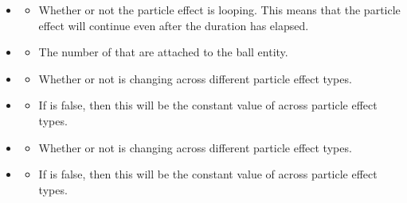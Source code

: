 \begin{singlespace}

	\begin{itemize}[nolistsep,topsep=5pt]
	\itemsep1.0em

		\item {}
		\begin{itemize}[nolistsep,topsep=0pt]
			\item Whether or not the particle effect is looping. This means that the particle effect will continue even after the duration has elapsed.
		\end{itemize}

		\item {}
		\begin{itemize}[nolistsep,topsep=0pt]
			\item The number of  that are attached to the ball entity.
		\end{itemize}

		\item {}
		\begin{itemize}[nolistsep,topsep=0pt]
			\item Whether or not  is changing across different particle effect types.
		\end{itemize}

		\item {}
		\begin{itemize}[nolistsep,topsep=0pt]
			\item If  is false, then this will be the constant value of  across particle effect types.
		\end{itemize}

		\item {}
		\begin{itemize}[nolistsep,topsep=0pt]
			\item Whether or not  is changing across different particle effect types.
		\end{itemize}

		\item {}
		\begin{itemize}[nolistsep,topsep=0pt]
			\item If  is false, then this will be the constant value of  across particle effect types.
		\end{itemize}


\end{itemize}
\end{singlespace}
